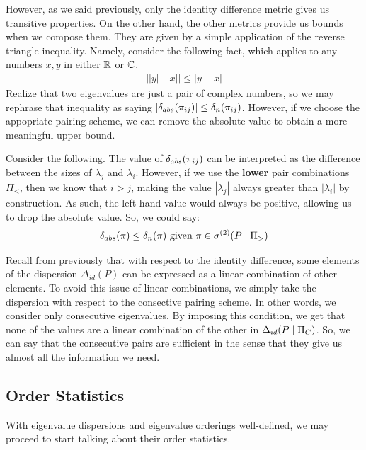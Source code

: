  However, as we said previously, only the identity difference metric gives us transitive properties.
On the other hand, the other metrics provide us bounds when we compose them.
They are given by a simple application of the reverse triangle inequality. Namely, consider the following fact, which applies to any numbers $x, y$ in either $\mathbb{R}$ or $\mathbb{C}$.
\begin{align*}
||y| - |x|| \leq |y - x|
\end{align*}
Realize that two eigenvalues are just a pair of complex numbers, so we may rephrase that inequality as saying $|\delta_{abs}(\pi_{ij})| \leq \delta_{n}(\pi_{ij})$.
However, if we choose the appopriate pairing scheme, we can remove the absolute value to obtain a more meaningful upper bound. \newline

Consider the following. The value of $\delta_{abs}(\pi_{ij})$ can be interpreted as the difference between the sizes of $\lambda_j$ and $\lambda_i$.
However, if we use the \textbf{lower} pair combinations $\Pi_<$, then we know that $i > j$, making the value $|\lambda_j|$ always greater than $|\lambda_i|$ by construction.
As such, the left-hand value would always be positive, allowing us to drop the absolute value. So, we could say:
\begin{align*}
\delta_{abs}(\pi) \leq \delta_{n}(\pi) \text{ given } \pi \in {\sigma^{(2)}}(P \mid \Pi_>)
\end{align*}
\medskip

 Recall from previously that with respect to the identity difference, some elements of the dispersion $\Delta_{id}(P)$
can be expressed as a linear combination of other elements. To avoid this issue of linear combinations, we simply take the dispersion with respect to the consective pairing scheme. In other words,
we consider only consecutive eigenvalues.
By imposing this condition, we get that none of the values are a linear combination of the other in $\Delta_{id}(P \mid \Pi_C)$. So, we can say that the consecutive pairs are sufficient in the sense that
they give us almost all the information we need.

\subsection{Order Statistics}
With eigenvalue dispersions and eigenvalue orderings well-defined, we may proceed to start talking about their order statistics.

